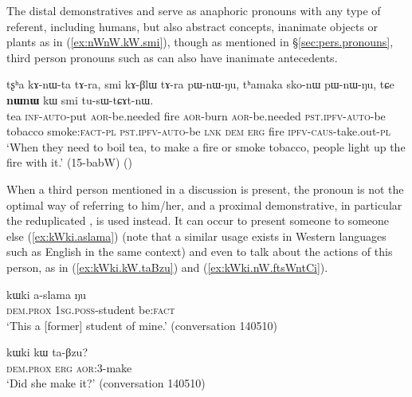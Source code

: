 The distal demonstratives  and  serve as anaphoric pronouns with any type of referent, including humans, but also abstract concepts, inanimate objects or plants as in (\ref{ex:nWnW.kW.smi}), though as mentioned in §\ref{sec:pers.pronouns},  third person pronouns such as  can also have inanimate antecedents.

\begin{exe}
\ex \label{ex:nWnW.kW.smi}
 \gll tʂʰa kɤ-nɯ-ta tɤ-ra, smi kɤ-βlɯ tɤ-ra pɯ-nɯ-ŋu, tʰamaka sko-nɯ pɯ-nɯ-ŋu, tɕe \textbf{nɯnɯ} kɯ smi tu-sɯ-tɕɤt-nɯ. \\
 tea \textsc{inf}-\textsc{auto}-put \textsc{aor}-be.needed fire  \textsc{aor}-burn \textsc{aor}-be.needed \textsc{pst}.\textsc{ipfv}-\textsc{auto}-be tobacco smoke:\textsc{fact}-\textsc{pl} \textsc{pst}.\textsc{ipfv}-\textsc{auto}-be \textsc{lnk} \textsc{dem} \textsc{erg} fire \textsc{ipfv}-\textsc{caus}-take.out-\textsc{pl} \\
 \glt `When they need to boil tea, to make a fire or smoke tobacco, people light up the fire with it.' (15-babW) ()
\end{exe}

When a third person mentioned in a discussion is present, the pronoun  is not the optimal way of referring to him/her, and a proximal demonstrative, in particular the reduplicated , is used instead. It can occur to present someone to someone else (\ref{ex:kWki.aslama}) (note that a similar usage exists in Western languages such as English in the same context) and even to talk about the actions of this person, as in  (\ref{ex:kWki.kW.taBzu}) and (\ref{ex:kWki.nW.ftsWntCi}).

\begin{exe}
\ex \label{ex:kWki.aslama}
 \gll kɯki a-slama ŋu \\
\textsc{dem}.\textsc{prox} \textsc{1sg}.\textsc{poss}-student be:\textsc{fact} \\
\glt `This a [former] student of mine.' (conversation 140510)
\end{exe}

\begin{exe}
\ex \label{ex:kWki.kW.taBzu}
 \gll  kɯki kɯ ta-βzu? \\
 \textsc{dem}.\textsc{prox} \textsc{erg} \textsc{aor}:3\flobv{}-make \\
 \glt `Did she make it?' (conversation 140510)
\end{exe}

